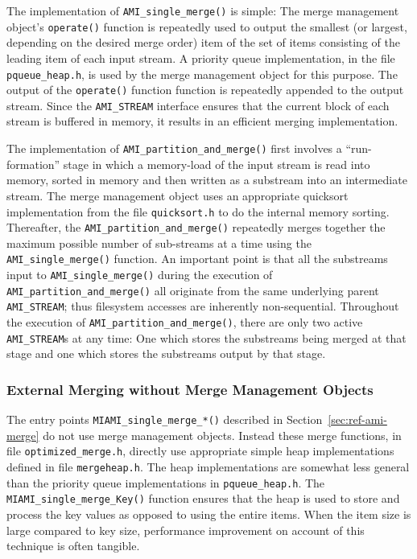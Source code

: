 The implementation of  \verb|AMI_single_merge()| is simple: The merge management
object's \verb|operate()| function
is repeatedly used to output the smallest (or largest, depending on the desired
merge order) item of the set of items consisting of the leading item of each input 
stream. A priority queue implementation, in the file \verb|pqueue_heap.h|, is
used by the merge management object for this purpose. The output of the  \verb|operate()| 
function function is repeatedly appended to the output stream. Since the \verb|AMI_STREAM| interface ensures that the current block of each stream is buffered in memory, it results 
in an efficient merging implementation.

The implementation of  \verb|AMI_partition_and_merge()| first involves 
a ``run-formation'' stage in which a memory-load of the input stream is 
read into memory, sorted in memory and then written as a substream into
an intermediate stream. The merge management object uses an appropriate 
quicksort implementation from the file \verb|quicksort.h| to do the internal
memory sorting. Thereafter, the \verb|AMI_partition_and_merge()| repeatedly
merges together the maximum possible number of sub-streams at a time using the 
\verb|AMI_single_merge()| function. An important point is that all the
substreams input to \verb|AMI_single_merge()| during the execution of 
\verb|AMI_partition_and_merge()| all originate from the same underlying
parent \verb|AMI_STREAM|; thus filesystem accesses are inherently non-sequential.
Throughout the execution of \verb|AMI_partition_and_merge()|, there are only
two active \verb|AMI_STREAM|s at any time: One which stores the substreams
being merged at that stage and one which stores the substreams output by
that stage.
\subsubsection{External Merging without Merge Management Objects}
The entry points \verb|MIAMI_single_merge_*()| described in Section~\ref{sec:ref-ami-merge} 
do not use merge management objects. Instead  these merge functions, in file
\verb|optimized_merge.h|,  directly use appropriate simple heap implementations 
defined in file \verb|mergeheap.h|. The heap implementations are somewhat less general
than the priority queue implementations in \verb|pqueue_heap.h|. The 
\verb|MIAMI_single_merge_Key()| function ensures that the heap is used to
store and process the key values as opposed to using the entire items. When
the item size is large compared to key size, performance improvement on account
of this technique is often tangible.

